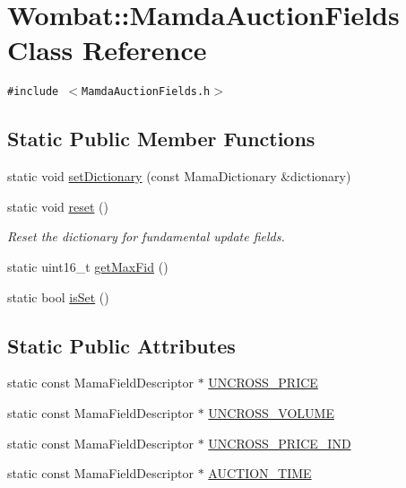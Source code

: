 \hypertarget{classWombat_1_1MamdaAuctionFields}{
\section{Wombat::Mamda\-Auction\-Fields Class Reference}
\label{classWombat_1_1MamdaAuctionFields}
}
{\tt \#include $<$Mamda\-Auction\-Fields.h$>$}

\subsection*{Static Public Member Functions}
\begin{CompactItemize}
\item 
static void \hyperlink{classWombat_1_1MamdaAuctionFields_04a03b13472ac525489f320e7dabf968}{set\-Dictionary} (const Mama\-Dictionary \&dictionary)
\item 
static void \hyperlink{classWombat_1_1MamdaAuctionFields_86e3c690a626fe8c088262db658b1b11}{reset} ()
\begin{CompactList}\small\item\em Reset the dictionary for fundamental update fields. \item\end{CompactList}\item 
static uint16\_\-t \hyperlink{classWombat_1_1MamdaAuctionFields_9a63f2491edf111a4930991c0c6ce068}{get\-Max\-Fid} ()
\item 
static bool \hyperlink{classWombat_1_1MamdaAuctionFields_5f110997c1c2c8a6a0c207cac660f0e3}{is\-Set} ()
\end{CompactItemize}
\subsection*{Static Public Attributes}
\begin{CompactItemize}
\item 
static const Mama\-Field\-Descriptor $\ast$ \hyperlink{classWombat_1_1MamdaAuctionFields_5594971ec726416241e33804da2d9fe5}{UNCROSS\_\-PRICE}
\item 
static const Mama\-Field\-Descriptor $\ast$ \hyperlink{classWombat_1_1MamdaAuctionFields_bc9cf080d7f976785770153845aa82ac}{UNCROSS\_\-VOLUME}
\item 
static const Mama\-Field\-Descriptor $\ast$ \hyperlink{classWombat_1_1MamdaAuctionFields_f0f88cdc1024ea546447c3bcef022ec3}{UNCROSS\_\-PRICE\_\-IND}
\item 
static const Mama\-Field\-Descriptor $\ast$ \hyperlink{classWombat_1_1MamdaAuctionFields_4b662ec01ab42f81ecc97b903adb5859}{AUCTION\_\-TIME}
\end{CompactItemize}


